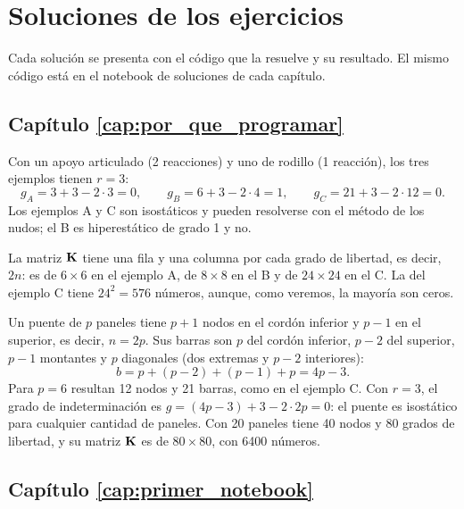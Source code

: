 \chapter{Soluciones de los ejercicios}\label{cap:soluciones}

Cada solución se presenta con el código que la resuelve y su resultado. El
mismo código está en el notebook de soluciones de cada capítulo.

\section*{Capítulo \ref{cap:por_que_programar}}

Con un apoyo articulado (2 reacciones) y uno de rodillo (1 reacción), los
tres ejemplos tienen $r = 3$:
\[
  g_A = 3 + 3 - 2 \cdot 3 = 0, \qquad
  g_B = 6 + 3 - 2 \cdot 4 = 1, \qquad
  g_C = 21 + 3 - 2 \cdot 12 = 0.
\]
Los ejemplos A y C son isostáticos y pueden resolverse con el método de los
nudos; el B es hiperestático de grado 1 y no.

La matriz $\mathbf{K}$ tiene una fila y una columna por cada grado de libertad, es
decir, $2n$: es de $6 \times 6$ en el ejemplo A, de $8 \times 8$ en el B y de
$24 \times 24$ en el C. La del ejemplo C tiene $24^2 = 576$ números, aunque,
como veremos, la mayoría son ceros.

Un puente de $p$ paneles tiene $p + 1$ nodos en el cordón inferior y
$p - 1$ en el superior, es decir, $n = 2p$. Sus barras son $p$ del cordón
inferior, $p - 2$ del superior, $p - 1$ montantes y $p$ diagonales (dos
extremas y $p - 2$ interiores):
\[
  b = p + (p - 2) + (p - 1) + p = 4p - 3.
\]
Para $p = 6$ resultan 12 nodos y 21 barras, como en el ejemplo C. Con
$r = 3$, el grado de indeterminación es
$g = (4p - 3) + 3 - 2 \cdot 2p = 0$: el puente es isostático para cualquier
cantidad de paneles. Con 20 paneles tiene 40 nodos y 80 grados de libertad,
y su matriz $\mathbf{K}$ es de $80 \times 80$, con 6400 números.

\section*{Capítulo \ref{cap:primer_notebook}}

